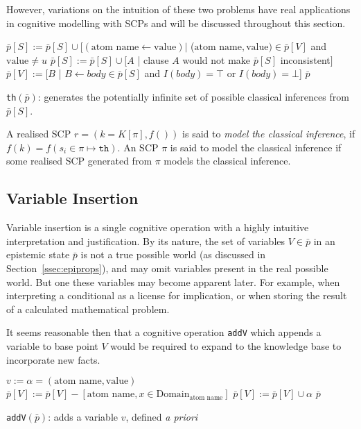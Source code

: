 However, variations on the intuition of these two problems have real applications in cognitive modelling with SCPs and will be discussed throughout this section.

\begin{algorithm}[H] \label{cogOp:th}
\SetAlgoLined
{}
{
$\bar{p}[S]:=\bar{p}[S] \cup [(\text{atom name} \leftarrow \text{value}) |$ ($\text{atom name},\text{value}) \in \bar{p}[V]$ and $\text{value} \neq u$\;
$\bar{p}[S]:=\bar{p}[S] \cup [A$ | clause $A$ would not make $\bar{p}[S]$ inconsistent$]$\;
$\bar{p}[V]:=[B$ | $B \leftarrow body \in \bar{p}[S]$ and $ I(body)=\top$ or $I(body)=\bot$]\; 
\Return $\bar{p}$
}

\caption{\texttt{th}$(\bar{p})$: generates the potentially infinite set of possible classical inferences from $\bar{p}[S]$.}
\end{algorithm}

A realised SCP $r=(k=K[\pi],f())$ is said to \textit{model the classical inference}, if $f(k) = f(s_i \in \pi \longmapsto \texttt{th})$. An SCP $\pi$ is said to model the classical inference if some realised SCP generated from $\pi$ models the classical inference.


\subsection{Variable Insertion}

Variable insertion is a single cognitive operation with a highly intuitive interpretation and justification. By its nature, the set of variables $V \in \bar{p}$ in an epistemic state $\bar{p}$ is not a true possible world (as discussed in Section~\ref{ssec:epiprops}), and may omit variables present in the real possible world. But one these variables may become apparent later. For example, when interpreting a conditional as a license for implication, or when storing the result of a calculated mathematical problem.

It seems reasonable then that a cognitive operation \texttt{addV} which appends a variable to base point $V$ would be required to expand to the knowledge base to incorporate new facts.

\begin{algorithm}[H] \label{cogOp:addV}
\SetAlgoLined
{}
$v:= \alpha=(\text{atom name},\text{value})$\;
{
$\bar{p}[V]:=\bar{p}[V] - [\text{atom name}, x \in \text{Domain}_\text{atom name}] $
$\bar{p}[V]:=\bar{p}[V] \cup \alpha$\;
\Return $\bar{p}$
}

\caption{\texttt{addV}$(\bar{p})$: adds a variable $v$, defined \textit{a priori}}
\end{algorithm}

